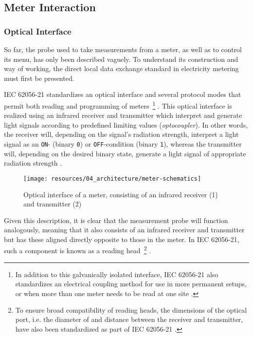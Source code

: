 \subsection{Meter Interaction}
\label{sec:meter-interaction}

\subsubsection{Optical Interface}
\label{sec:meter-interface}

So far, the probe used to take measurements from a meter, as well as to control its menu, has only been described vaguely. To understand its construction and way of working, the direct local data exchange standard in electricity metering must first be presented.

\acs{IEC} 62056-21 standardizes an optical interface and several protocol modes that permit both reading and programming of meters~\footnote{In addition to this galvanically isolated interface, \acs{IEC} 62056-21 also standardizes an electrical coupling method for use in more permanent setups, or when more than one meter needs to be read at one site \cite[p.~15]{iec2002d0}.} \cite[p.~15]{iec2002d0}. This optical interface is realized using an infrared receiver and transmitter which interpret and generate light signals according to predefined limiting values (\textit{optocoupler}). In other words, the receiver will, depending on the signal's radiation strength, interpret a light signal as an \texttt{ON}- (binary \texttt{0}) or \texttt{OFF}-condition (binary \texttt{1}), whereas the transmitter will, depending on the desired binary state, generate a light signal of appropriate radiation strength \cite[pp.~30--31]{iec2002d0}.

\begin{figure}[hbt]
  \centering
  \texttt{[image: resources/04\_architecture/meter-schematics]}
  \caption[Optical interface of a meter]{Optical interface of a meter, consisting of an infrared receiver (1) and transmitter (2) \cite[p.~7]{nzr2011ehz}}
  \label{fig:meter-schematics}
\end{figure}

\FloatBarrier

Given this description, it is clear that the measurement probe will function analogously, meaning that it also consists of an infrared receiver and transmitter but has these aligned directly opposite to those in the meter. In \acs{IEC} 62056-21, such a component is known as a reading head~\footnote{To ensure broad compatibility of reading heads, the dimensions of the optical port, i.e. the diameter of and distance between the receiver and transmitter, have also been standardized as part of \acs{IEC} 62056-21 \cite[p.~25]{iec2002d0}.} \cite[p.~29]{iec2002d0}.

